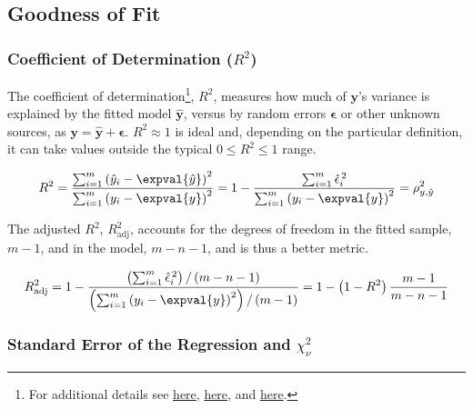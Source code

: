 \subsection{Goodness of Fit}
\label{regression:linear:goodness_of_fit}

\subsubsection{Coefficient of Determination ($R^{2}$)}
\label{regression:linear:goodness_of_fit:R2}

The coefficient of determination\footnote{For additional details see
\href{https://economictheoryblog.com/2014/11/05/the-coefficient-of-determination-latex-r2/}{here},
\href{https://economictheoryblog.com/2014/11/05/proof/}{here}, and
\href{http://people.duke.edu/~rnau/rsquared.htm}{here}.}, $R^{2}$,
measures how much of $\mathbf{y}$'s variance is explained by the fitted model $\hat{\mathbf{y}}$,
versus by random errors $\mathbf{\epsilon}$ or other unknown sources,
as $\mathbf{y} = \hat{\mathbf{y}} + \mathbf{\epsilon}$.
$R^{2} \approx 1$ is ideal and, depending on the particular definition,
it can take values outside the typical $0 \leq R^{2} \leq 1$ range.

\begin{equation}\label{eq:regression:linear:goodness_of_fit:R2}
R^{2} = \frac{
\sum_{i=1}^{m} \left(\hat{y}_{i} - \expval{\hat{y}}\right)^{2}
}{
\sum_{i=1}^{m} \left(y_{i} - \expval{y}\right)^{2}
} = 1 - \frac{
\sum_{i=1}^{m} \hat{\epsilon}_{i}^{\,2}
}{
\sum_{i=1}^{m} \left(y_{i} - \expval{y}\right)^{2}
} = \rho_{y,\hat{y}}^{2}
\end{equation}

The adjusted $R^{2}$, $R^{2}_{\text{adj}}$, accounts for the degrees of freedom in the
fitted sample, $m-1$, and in the model, $m-n-1$, and is thus a better metric.

\begin{equation}\label{eq:regression:linear:goodness_of_fit:R2_adj}
R^{2}_{\text{adj}} = 1 - \frac{
\left(\sum_{i=1}^{m} \hat{\epsilon}_{i}^{\,2}\right)/\left(m-n-1\right)
}{
\left(\sum_{i=1}^{m} \left(y_{i} - \expval{y}\right)^{2}\right)/\left(m-1\right)
}
= 1 - \left(1-R^{2}\right)\frac{m-1}{m-n-1}
\end{equation}

\subsubsection{Standard Error of the Regression and $\chi_{\nu}^{2}$}
\label{regression:linear:goodness_of_fit:reduced_chi2}

